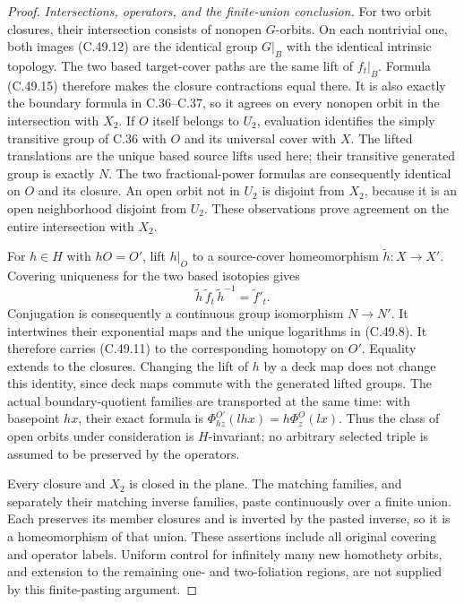 \begin{proof}
\emph{Intersections, operators, and the finite-union conclusion.}
For two orbit closures, their intersection consists of
nonopen $G$-orbits. On each nontrivial one, both images
(C.49.12) are the identical group $G|_B$ with the identical
intrinsic topology. The two based target-cover paths
are the same lift of $f_t|_B$. Formula (C.49.15)
therefore makes the closure contractions equal there.
It is also exactly the boundary formula in C.36--C.37,
so it agrees on every nonopen orbit in the intersection
with $X_2$.
If $O$ itself belongs to $U_2$, evaluation identifies the
simply transitive group of C.36 with $O$ and its universal
cover with $X$. The lifted translations are the unique
based source lifts used here; their transitive generated
group is exactly $N$. The two fractional-power formulas
are consequently identical on $O$ and its closure.
An open orbit not in $U_2$ is disjoint from $X_2$, because
it is an open neighborhood disjoint from $U_2$.
These observations prove agreement on the entire
intersection with $X_2$.

For $h\in H$ with $hO=O'$, lift $h|_O$ to a source-cover
homeomorphism $\widetilde h:X\to X'$.
Covering uniqueness for the two based isotopies gives
\[
              \widetilde h\,\widetilde f_t\,
                 \widetilde h^{-1}=\widetilde f'_t .
                                                        \tag{C.49.16}
\]
Conjugation is consequently a continuous group isomorphism
$N\to N'$. It intertwines their exponential maps and
the unique logarithms in (C.49.8).
It therefore carries (C.49.11) to the corresponding
homotopy on $O'$. Equality extends to the closures.
Changing the lift of $h$ by a deck map does not change
this identity, since deck maps commute with the generated
lifted groups.
The actual boundary-quotient families are transported
at the same time: with basepoint $hx$, their exact
formula is
$\Phi^{O'}_{hz}(lhx)=h\Phi^O_z(lx)$.
Thus the class of open orbits under consideration is
$H$-invariant; no arbitrary selected triple is assumed
to be preserved by the operators.

Every closure and $X_2$ is closed in the plane.
The matching families, and separately their matching
inverse families, paste continuously over a finite union.
Each preserves its member closures and is inverted by
the pasted inverse, so it is a homeomorphism of that union.
These assertions include all original covering and
operator labels. Uniform control for infinitely many
new homothety orbits, and extension to the remaining
one- and two-foliation regions, are not supplied by
this finite-pasting argument.
\end{proof}
